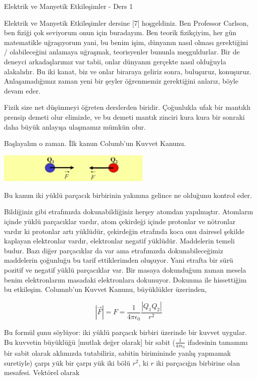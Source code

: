 \documentclass[12pt,fleqn]{article}\usepackage{../../common}
\begin{document}
Elektrik ve Manyetik Etkileşimler - Ders 1

Elektrik ve Manyetik Etkileşimler dersine [7] hoşgeldiniz. Ben Professor
Carlson, ben fiziği çok seviyorum onun için buradayım. Ben teorik fizikçiyim,
her gün matematikle uğraşıyorum yani, bu benim işim, dünyanın nasıl olması
gerektiğini / olabileceğini anlamaya uğraşmak, teorisyenler bununla
meşguldurlar. Bir de deneyci arkadaşlarımız var tabii, onlar dünyanın gerçekte
nasıl olduğuyla alakalıdır. Bu iki kanat, biz ve onlar biraraya geliriz sonra,
buluşuruz, konuşuruz. Anlaşamadığımız zaman yeni bir şeyler öğrenmemiz
gerektiğini anlarız, böyle devam eder.

Fizik size net düşünmeyi öğreten derslerden biridir. Çoğunlukla ufak bir
mantıklı prensip demeti olur elimizde, ve bu demeti mantık zinciri kura
kura bir sonraki daha büyük anlayışa ulaşmamız mümkün olur. 

Başlayalım o zaman. İlk kanun Columb'un Kuvvet Kanunu.

\includegraphics[width=20em]{elecmag_01.png} 

Bu kanun iki yüklü parçacık birbirinin yakınına gelince ne olduğunu
kontrol eder. 

Bildiğiniz gibi etrafınızda dokunabildiğiniz herşey atomdan
yapılmıştır. Atomların içinde yüklü parçacıklar vardır, atom çekirdeği
içinde protonlar ve nötronlar vardır ki protonlar artı yüklüdür, çekirdeğin
etrafında koca onu dairesel şekilde kaplayan elektronlar vardır,
elektronlar negatif yüklüdür. Maddelerin temeli budur. Bazı diğer
parçacıklar da var ama etrafımızda dokunabileceğimiz maddelerin çoğunluğu
bu tarif ettiklerimden oluşuyor. Yani etrafta bir sürü pozitif ve negatif
yüklü parçacıklar var. Bir masaya dokunduğum zaman mesela benim
elektronlarım masadaki elektronlara dokunuyor. Dokunma ile hissettiğim bu
etkileşim. Columnb'un Kuvvet Kanunu, büyüklükler üzerinden,

$$ 
|\vec{F}|  = F = \frac{1}{4\pi \epsilon_0} \frac{|Q_1 Q_2|}{r^2}
$$

Bu formül şunu söylüyor: iki yüklü parçacık birbiri üzerinde bir kuvvet
uygular. Bu kuvvetin büyüklüğü [mutlak değer olarak] bir sabit
($\frac{1}{4\pi \epsilon_0}$ ifadesinin tamamını bir sabit olarak
aklımızda tutabiliriz, sabitin birimininde yanlış yapmamak suretiyle) çarpı
yük bir çarpı yük iki bölü $r^2$, ki $r$ iki parçacığın birbirine olan
mesafesi. Vektörel olarak
\end{document}
